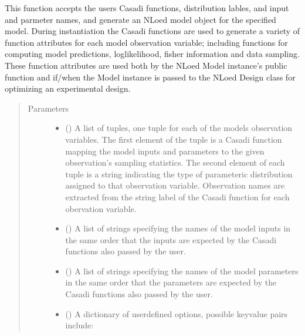\documentclass[letterpaper,10pt,english,openany,oneside]{sphinxmanual}
\begin{document}
\begin{fulllineitems}
\begin{fulllineitems}
This function accepts the users Casadi functions, distribution lables, and input and
parmeter names, and generate an NLoed model object for the specified model. During instantiation
the Casadi functions are used to generate a variety of function attributes for each model
observation variable; including functions for computing model predictions, loglikelihood,
fisher information and data sampling. These function attributes are used both by the NLoed
Model instance’s public function and if/when the Model instance is passed to the NLoed Design
class for optimizing an experimental design.
\begin{quote}\begin{description}
\item[{Parameters}] \leavevmode\begin{itemize}
\item {} 
 () \textendash{} A list of tuples, one tuple for each of the models
observation variables. The first element of the tuple is a Casadi function mapping
the model inputs and parameters to the given observation’s sampling statistics. The
second element of each tuple is a string indicating the type of parameteric distribution
assigned to that observation variable. Observation names are extracted from the string
label of the Casadi function for each obervation variable.

\item {} 
 () \textendash{} A list of strings specifying the names of the model inputs
in the same order that the inputs are expected by the Casadi functions also passed by
the user.

\item {} 
 () \textendash{} A list of strings specifying the names of the model parameters
in the same order that the parameters are expected by the Casadi functions also passed by
the user.

\item {} 
 (\sphinxstyleliteralemphasis{\sphinxupquote{, }}) \textendash{} 
A dictionary of user\sphinxhyphen{}defined options, possible key\sphinxhyphen{}value pairs
include:


\end{itemize}
\end{description}
\end{quote}
\end{fulllineitems}
\end{fulllineitems}
\end{document}
